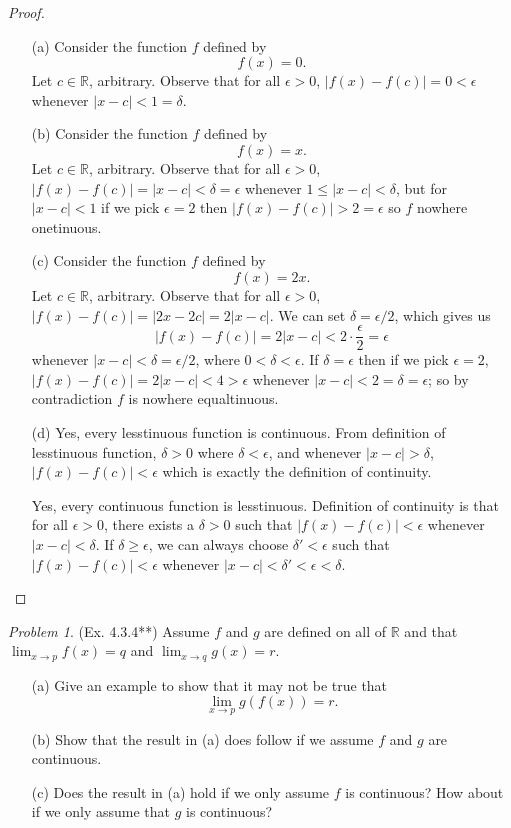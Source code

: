 \documentclass[11pt,twoside, reqno]{amsart}
\theoremstyle{remark}
\newtheorem{Prob}{Problem}
\def\R{\mathbb R}
\begin{document}
\begin{proof}
\begin{enumerate}
    \item [(a)] Consider the function $f$ defined by
    $$
        f(x) = 0.
    $$
    Let $c \in \R$, arbitrary. Observe that for all $\epsilon > 0$, $|f(x) - f(c)| = 0 < \epsilon$ whenever $|x - c| < 1 = \delta$.
    \item [(b)] Consider the function $f$ defined by
    $$
        f(x) = x.
    $$
    Let $c \in \R$, arbitrary. Observe that for all $\epsilon > 0$, $|f(x) - f(c)| = |x - c| < \delta = \epsilon$ whenever $1 \leq |x - c| < \delta$, but for $|x - c| < 1$ if we pick $\epsilon = 2$ then $|f(x) - f(c)| > 2 = \epsilon$ so $f$ nowhere onetinuous.
    \item [(c)] Consider the function $f$ defined by
    $$
        f(x) = 2x.
    $$
    Let $c \in \R$, arbitrary. Observe that for all $\epsilon > 0$, $|f(x) - f(c)| = |2x - 2c| = 2|x - c|$. We can set $\delta = \epsilon / 2$, which gives us
    $$
        |f(x) - f(c)| = 2|x - c| < 2 \cdot \frac{\epsilon}{2} = \epsilon
    $$
    whenever $|x - c| < \delta = \epsilon / 2$, where $0 < \delta < \epsilon$. If $\delta = \epsilon$ then if we pick $\epsilon = 2$, $|f(x) - f(c)| = 2|x - c| < 4 > \epsilon$ whenever $|x - c| < 2 = \delta = \epsilon$; so by contradiction $f$ is nowhere equaltinuous. 
    \item [(d)] Yes, every lesstinuous function is continuous. From definition of lesstinuous function, $\delta > 0$ where $\delta < \epsilon$, and whenever $|x - c| > \delta$, $|f(x) - f(c)| < \epsilon$ which is exactly the definition of continuity. 
    
    Yes, every continuous function is lesstinuous. Definition of continuity is that for all $\epsilon > 0$, there exists a $\delta > 0$ such that $|f(x) - f(c)| < \epsilon$ whenever $|x - c| < \delta$. If $\delta \geq \epsilon$, we can always choose $\delta' < \epsilon$ such that $|f(x) - f(c)| < \epsilon$ whenever $|x - c| < \delta' < \epsilon < \delta$. 
\end{enumerate}

\end{proof}

\begin{Prob}(Ex. 4.3.4**) Assume $f$ and $g$ are defined on all of $\R$ and that $\displaystyle \lim_{x \to p} f(x) = q$ and $\displaystyle \lim_{x \to q} g(x) = r$.
\begin{enumerate}
    \item [(a)] Give an example to show that it may not be true that
    $$
        \lim_{x \to p} g(f(x)) = r.
    $$
    \item [(b)] Show that the result in (a) does follow if we assume $f$ and $g$ are continuous.
    \item [(c)] Does the result in (a) hold if we only assume $f$ is continuous? How about if we only assume that $g$ is continuous?
\end{enumerate}
\end{Prob}
\end{document}
